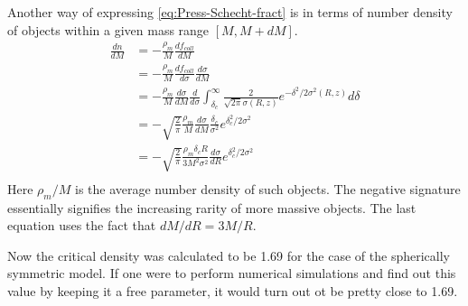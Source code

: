 \documentclass[12pt,a4paper,twoside]{book}
\begin{document}
		Another way of expressing \ref{eq:Press-Schecht-fract} is in terms of number density of objects within a given mass range $[M,M+dM]$.
		\begin{equation}
			\begin{aligned}
				\frac{dn}{dM}&=-\frac{\rho_m}{M}\frac{df_{coll}}{dM}\\
				&=-\frac{\rho_m}{M}\frac{df_{coll}}{d\sigma}\frac{d\sigma}{dM}\\
				&=-\frac{\rho_m}{M}\frac{d\sigma}{dM}\frac{d}{d\sigma}\int_{\delta_c}^{\infty}\frac{2}{\sqrt{2\pi}\sigma(R,z)}e^{-\delta^2/2\sigma^2(R,z)}d\delta\\
				&=-\sqrt{\frac{2}{\pi}}\frac{\rho_m}{M}\frac{d\sigma}{dM}\frac{\delta_c}{\sigma^2}e^{\delta_c^2/2\sigma^2}\\
				&=-\sqrt{\frac{2}{\pi}}\frac{\rho_m\delta_cR}{3M^2\sigma^2}\frac{d\sigma}{dR}e^{\delta_c^2/2\sigma^2}\\
			\end{aligned}
		\end{equation}
		Here $\rho_m/M$ is the average number density of such objects. The negative signature essentially signifies the increasing rarity of more massive objects. The last equation uses the fact that $dM/dR = 3M/R$.
		
		Now the critical density was calculated to be 1.69 for the case of the spherically symmetric model. If one were to perform numerical simulations and find out this value by keeping it a free parameter, it would turn out ot be pretty close to 1.69.  
\end{document}

